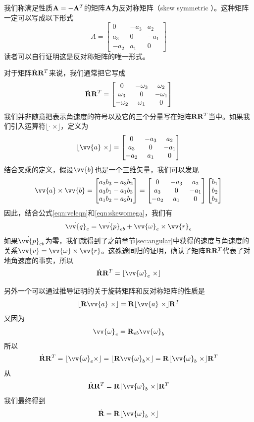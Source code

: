 \documentclass[11pt]{article}
\begin{document}
我们称满足性质${\bf A} = -{\bf A}^T  $的矩阵${\bf A}$为反对称矩阵（skew symmetric ）。这种矩阵一定可以写成以下形式
$$
A = \begin{bmatrix}
0 & -a_3 & a_2\\
a_3 & 0 & - a_1\\
-a_2 & a_1 & 0
\end{bmatrix}
$$
读者可以自行证明这是反对称矩阵的唯一形式。

对于矩阵$\dot{{\bf R}}{\bf R}^T$来说，我们通常把它写成
\begin{equation}\label{eqn:skewomega}
\dot{{\bf R}}{\bf R}^T = \begin{bmatrix}
0 & -\omega_3 & \omega_2\\
\omega_3 & 0 & - \omega_1\\
-\omega_2 & \omega_1 & 0
\end{bmatrix}
\end{equation}
我们并非随意把表示角速度的符号以及它的三个分量写在矩阵$\dot{{\bf R}}{\bf R}^T$当中。如果我们引入运算符$\lfloor \cdot \ \times \rfloor$，定义为
$$
\lfloor \vv{a} \ \times \rfloor =  \begin{bmatrix}
0 & -a_3 & a_2\\
a_3 & 0 & - a_1\\
-a_2 & a_1 & 0
\end{bmatrix}
$$
结合叉乘的定义，假设$\vv{b}$也是一个三维矢量，我们可以发现
$$
\vv{a} \times \vv{b} = 
\begin{bmatrix}
a_2b_3-a_3b_2\\
a_3b_1-a_1b_3\\
a_1b_2-a_2b_1
\end{bmatrix} =
\begin{bmatrix}
0 & -a_3 & a_2\\
a_3 & 0 & - a_1\\
-a_2 & a_1 & 0
\end{bmatrix}
\begin{bmatrix}
b_1\\
b_2\\
b_3
\end{bmatrix}
$$
因此，结合公式\ref{eqn:veleqn}和\ref{eqn:skewomega}，我们有
$$
\dot{\vv{q}}_{e}  = \dot{ \vv{p}}_{eb} + \vv{\omega}_e \times \vv{r}_e
$$
如果$\dot{ \vv{p}}_{eb}$为零，我们就得到了之前章节\ref{sec:angular}中获得的速度与角速度的关系$\vv{v} = \vv{\omega} \times \vv{r}$。这殊途同归的证明，确认了矩阵$\dot{{\bf R}}{\bf R}^T$代表了对地角速度的事实，所以
$$
\dot{{\bf R}}{\bf R}^T = \lfloor \vv{\omega}_e\  \times \rfloor
$$

另外一个可以通过推导证明的关于旋转矩阵和反对称矩阵的性质是
$$
\lfloor {\bf R}\vv{a} \ \times \rfloor = {\bf R} \lfloor \vv{a} \ \times \rfloor {\bf R}^T
$$
又因为
$$
\vv{\omega}_e = {\bf R}_{eb}\vv{\omega}_b
$$
所以
$$
\dot{{\bf R}}{\bf R}^T = 
\lfloor \vv{\omega}_e \times \rfloor = 
\lfloor {\bf R}\vv{\omega}_b \times \rfloor = 
{\bf R} \lfloor \vv{\omega}_b \ \times \rfloor {\bf R}^T
$$
从
$$
\dot{{\bf R}}{\bf R}^T  =
{\bf R} \lfloor \vv{\omega}_b \ \times \rfloor {\bf R}^T
$$
我们最终得到
$$
\dot{{\bf R}} = {\bf R}\lfloor \vv{\omega}_b \ \times \rfloor
$$
\end{document}
